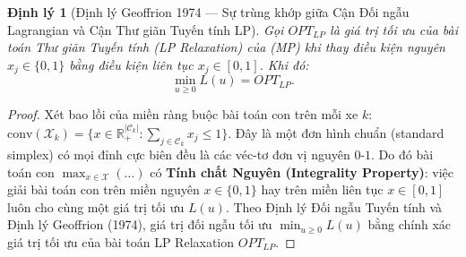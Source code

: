 \documentclass[11pt,a4paper]{article}
\newtheorem{theorem}{Định lý}[section]
\theoremstyle{definition}
\begin{document}
\begin{theorem}[Định lý Geoffrion 1974 --- Sự trùng khớp giữa Cận Đối ngẫu Lagrangian và Cận Thư giãn Tuyến tính LP]
Gọi $OPT_{LP}$ là giá trị tối ưu của bài toán Thư giãn Tuyến tính (LP Relaxation) của (MP) khi thay điều kiện nguyên $x_j \in \{0, 1\}$ bằng điều kiện liên tục $x_j \in [0, 1]$. Khi đó:
\begin{equation}
    \min_{u \ge 0} L(u) = OPT_{LP}.
\end{equation}
\end{theorem}
\begin{proof}
Xét bao lồi của miền ràng buộc bài toán con trên mỗi xe $k$: $\text{conv}(\mathcal{X}_k) = \{ x \in \mathbb{R}_+^{|\mathcal{C}_k|} : \sum_{j \in \mathcal{C}_k} x_j \le 1 \}$. Đây là một đơn hình chuẩn (standard simplex) có mọi đỉnh cực biên đều là các véc-tơ đơn vị nguyên $0\text{-}1$. Do đó bài toán con $\max_{x \in \mathcal{X}} (\dots)$ có \textbf{Tính chất Nguyên (Integrality Property)}: việc giải bài toán con trên miền nguyên $x \in \{0, 1\}$ hay trên miền liên tục $x \in [0, 1]$ luôn cho cùng một giá trị tối ưu $L(u)$. Theo Định lý Đối ngẫu Tuyến tính và Định lý Geoffrion (1974), giá trị đối ngẫu tối ưu $\min_{u \ge 0} L(u)$ bằng chính xác giá trị tối ưu của bài toán LP Relaxation $OPT_{LP}$.
\end{proof}
\end{document}
